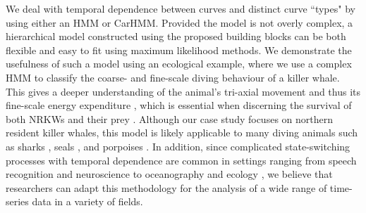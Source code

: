 
We deal with temporal dependence between curves and distinct curve ``types" by using either an HMM or CarHMM.
Provided the model is not overly complex, a hierarchical model constructed using the proposed building blocks can be both flexible and easy to fit using maximum likelihood methods. We demonstrate the usefulness of such a model using an ecological example, where we use a complex HMM to classify the coarse- and fine-scale diving behaviour of a killer whale. This gives a deeper understanding of the animal's tri-axial movement and thus its fine-scale energy expenditure \citep{Gleiss:2011,Qasem:2012}, which is essential when discerning the survival of both NRKWs and their prey \citep{Noren:2011}. Although our case study focuses on northern resident killer whales, this model is likely applicable to many diving animals such as sharks \citep{Adam:2019}, seals \citep{Dot:2016}, and porpoises \citep{Barajas:2017}. In addition, since complicated state-switching processes with temporal dependence are common in settings ranging from speech recognition \citep{Juang:1991} and neuroscience \citep{Langrock:2013} to oceanography \citep{Bulla:2012} and ecology \citep{Adam:2019}, we believe that researchers can adapt this methodology for the analysis of a wide range of time-series data in a variety of fields.